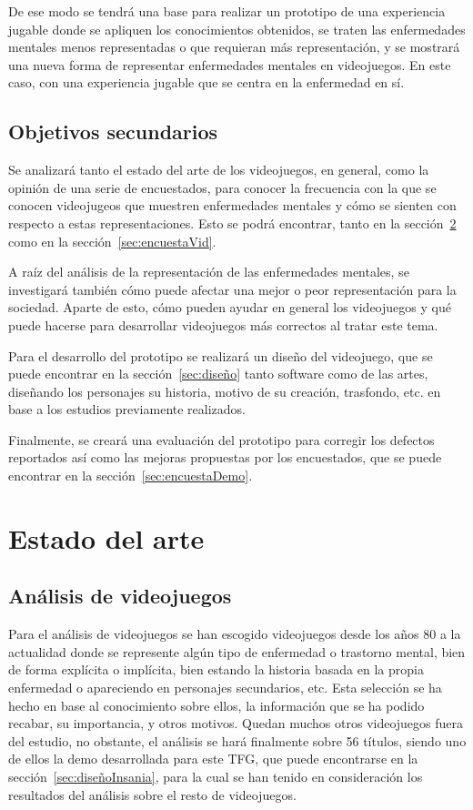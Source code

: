 \documentclass[12pt, a4paper,twoside,titlepage]{book}
\begin{document}
    De ese modo se tendrá una base para realizar un prototipo de una experiencia jugable donde se apliquen los conocimientos obtenidos, se traten las enfermedades mentales menos representadas o que requieran más representación, y se mostrará una nueva forma de representar enfermedades mentales en videojuegos. En este caso, con una experiencia jugable que se centra en la enfermedad en sí.
    
   
    \section{Objetivos secundarios}
    
     Se analizará tanto el estado del arte de los videojuegos, en general, como la opinión de una serie de encuestados, para conocer la frecuencia con la que se conocen videojugeos que muestren enfermedades mentales y cómo se sienten con respecto a estas representaciones. Esto se podrá encontrar, tanto en la sección~\ref{sec:estadoArte} como en la sección~\ref{sec:encuestaVid}.       
       
     A raíz del análisis de la representación de las enfermedades mentales, se investigará también cómo puede afectar una mejor o peor representación para la sociedad. Aparte de esto, cómo pueden ayudar en general los videojuegos y qué puede hacerse para desarrollar videojuegos más correctos al tratar este tema.   
     
     Para el desarrollo del prototipo se realizará un diseño del videojuego, que se puede encontrar en la sección~\ref{sec:diseño} tanto software como de las artes, diseñando los personajes su historia, motivo de su creación, trasfondo, etc. en base a los estudios previamente realizados. 
     
     Finalmente, se creará una evaluación del prototipo para corregir los defectos reportados así como las mejoras propuestas por los encuestados, que se puede encontrar en la sección~\ref{sec:encuestaDemo}. 
  
\chapter{Estado del arte}
\label{sec:estadoArte}
\section{Análisis de videojuegos}

Para el análisis de videojuegos se han escogido videojuegos desde los años 80 a la actualidad donde se represente algún tipo de enfermedad o trastorno mental, bien de forma explícita o implícita, bien estando la historia basada en la propia enfermedad o apareciendo en personajes secundarios, etc. Esta selección se ha hecho en base al conocimiento sobre ellos, la información que se ha podido recabar, su importancia, y otros motivos. Quedan muchos otros videojuegos fuera del estudio, no obstante, el análisis se hará finalmente sobre 56 títulos, siendo uno de ellos la demo desarrollada para este TFG, que puede encontrarse en la sección~\ref{sec:diseñoInsania}, para la cual se han tenido en consideración los resultados del análisis sobre el resto de videojuegos. 
\end{document}
